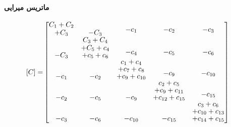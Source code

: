 \paragraph{ماتریس میرایی}
\begin{equation}\label{Eq.damping_matrix_dimensional_combined}
\begin{aligned}
[C] = &
\begin{bmatrix}
\shortstack{$C_1 + C_2$ \\ $+ C_3$} & -C_3 & \shortstack{$-c_1$ \\ \,} & \shortstack{$-c_2$ \\ \,} & \shortstack{$-c_3$ \\ \,} \\
-C_3 & \shortstack{$C_3 + C_4$ \\ $+ C_5 + c_4$ \\ $+ c_5 + c_6$} & \shortstack{$-c_4$ \\ \,} & \shortstack{$-c_5$ \\ \,} & \shortstack{$-c_6$ \\ \,} \\
-c_1 & -c_2 & \shortstack{$c_1 + c_4$ \\ $+ c_7 + c_8$ \\ $+ c_9 + c_{10}$} & \shortstack{$-c_9$ \\ \,} & \shortstack{$-c_{10}$ \\ \,} \\
-c_2 & -c_5 & -c_9 & \shortstack{$c_2 + c_5$ \\ $+ c_9 + c_{11}$ \\ $+ c_{12} + c_{15}$} & \shortstack{$-c_{15}$ \\ \,} \\
-c_3 & -c_{6} & -c_{10} & -c_{15} & \shortstack{$c_3 + c_6$ \\ $+ c_{10} + c_{13}$ \\ $+ c_{14} + c_{15}$}
\end{bmatrix}
\end{aligned}
\end{equation}

